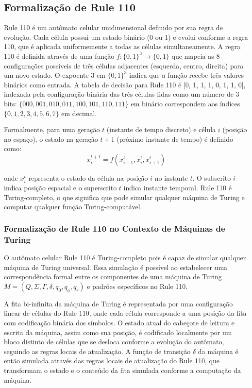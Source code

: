 \documentclass[12pt]{article}
\begin{document}
\subsection{Formalização de Rule 110}

Rule 110 é um autômato celular unidimensional definido por sua regra de evolução. Cada célula possui um estado binário (0 ou 1) e evolui conforme a regra 110, que é aplicada uniformemente a todas as células simultaneamente. A regra 110 é definida através de uma função $f: \{0, 1\}^3 \rightarrow \{0, 1\}$ que mapeia as 8 configurações possíveis de três células adjacentes (esquerda, centro, direita) para um novo estado. O expoente 3 em $\{0, 1\}^3$ indica que a função recebe três valores binários como entrada. A tabela de decisão para Rule 110 é [0, 1, 1, 1, 0, 1, 1, 0], indexada pela configuração binária das três células lidas como um número de 3 bits: $\{000, 001, 010, 011, 100, 101, 110, 111\}$ em binário correspondem aos índices $\{0, 1, 2, 3, 4, 5, 6, 7\}$ em decimal.

Formalmente, para uma geração $t$ (instante de tempo discreto) e célula $i$ (posição no espaço), o estado na geração $t+1$ (próximo instante de tempo) é definido como:
\begin{equation}
x_i^{t+1} = f(x_{i-1}^t, x_i^t, x_{i+1}^t)
\end{equation}

onde $x_i^t$ representa o estado da célula na posição $i$ no instante $t$. O subscrito $i$ indica posição espacial e o superscrito $t$ indica instante temporal. Rule 110 é Turing-completo, o que significa que pode simular qualquer máquina de Turing e computar qualquer função Turing-computável.

    \subsubsection{Formalização de Rule 110 no Contexto de Máquinas de Turing}

O autômato celular Rule 110 é Turing-completo pois é capaz de simular qualquer máquina de Turing universal. Essa simulação é possível ao estabelecer uma correspondência formal entre os componentes de uma máquina de Turing \( M = (Q, \Sigma, \Gamma, \delta, q_0, q_a, q_r) \) e padrões específicos no Rule 110.

A fita bi-infinita da máquina de Turing é representada por uma configuração linear de células do Rule 110, onde cada célula corresponde a uma posição da fita com codificação binária dos símbolos. O estado atual do cabeçote de leitura e escrita da máquina, assim como sua posição, é codificado localmente por um bloco distinto de células que se desloca conforme a evolução do autômato, seguindo as regras locais de atualização. A função de transição \( \delta \) da máquina é então simulada através das regras locais de atualização do Rule 110, que transformam o estado e o conteúdo da fita simulada conforme a computação da máquina.
\end{document}
